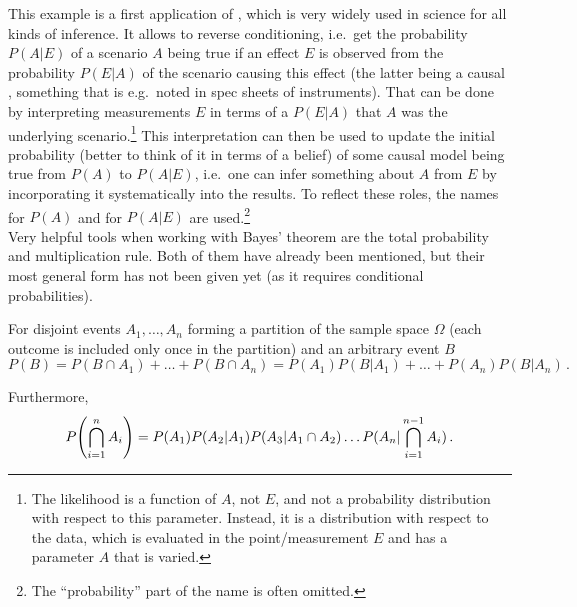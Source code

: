 This example is a first application of , which is very widely used in science for all kinds of inference. It allows to reverse conditioning, i.e.~get the probability $P(A | E)$ of a scenario $A$ being true if an effect $E$ is observed from the probability $P(E | A)$ of the scenario causing this effect (the latter being a causal , something that is e.g.~noted in spec sheets of instruments). That can be done by interpreting measurements $E$ in terms of a  $P(E | A)$ that $A$ was the underlying scenario.\footnote{The likelihood is a function of $A$, not $E$, and not a probability distribution with respect to this parameter. Instead, it is a distribution with respect to the data, which is evaluated in the point/measurement $E$ and has a parameter $A$ that is varied.} This interpretation can then be used to update the initial probability (better to think of it in terms of a belief) of some causal model being true from $P(A)$ to $P(A| E)$, i.e.~one can infer something about $A$ from $E$ by incorporating it systematically into the results. To reflect these roles, the names  for $P(A)$ and  for $P(A | E)$ are used.\footnote{The \enquote{probability} part of the name is often omitted.}\\


Very helpful tools when working with Bayes' theorem are the total probability and multiplication rule. Both of them have already been mentioned, but their most general form has not been given yet (as it requires conditional probabilities).
\begin{prop}
For disjoint events $A_1, \dots, A_n$ forming a partition of the sample space $\Omega$ (each outcome is included only once in the partition) and an arbitrary event $B$
\begin{equation}\label{eq:tot_prob_rule}
P(B) = P(B \cap A_1) + \dots + P(B \cap A_n) = P(A_1) P(B | A_1) + \dots + P(A_n) P(B | A_n) \, .
\end{equation}

Furthermore,
\begin{equation}
P\qty(\bigcap_{i = 1}^n A_i) = P(A_1) P(A_2 | A_1) P(A_3 | A_1 \cap A_2) \dots P(A_n | \bigcap_{i = 1}^{n - 1} A_i) \, .
\end{equation}
\end{prop}


